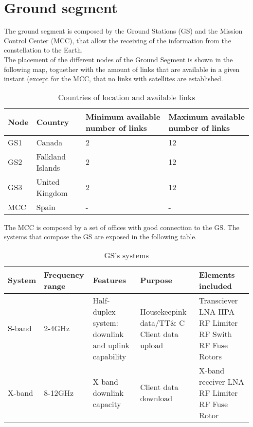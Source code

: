 \section{Ground segment}
The ground segment is composed by the Ground Stations (GS) and the Mission Control Center (MCC), that allow the receiving of the information from the constellation to the Earth.\\
The placement of the different nodes of the Ground Segment is shown in the following map, toguether with the amount of links that are available in a given instant (except for the MCC, that no links with satellites are established.  
\begin{table}[H]
\begin{center}
\begin{tabular}{|l|l|p{3.5cm}|p{3.5cm}|}
\hline
\rowcolor{blue} \textbf{Node}&\textbf{Country}&\textbf{Minimum available number of links}&\textbf{Maximum available number of links}\\
\hline
GS1&Canada&2&12\\
\hline
GS2&Falkland Islands&2&12\\
\hline
GS3&United Kingdom&2&12\\
\hline
MCC&Spain&-&-\\
\hline
\end{tabular}
\caption{Countries of location and available links}
\end{center}
\end{table}
The MCC is composed by a set of offices with good connection to the GS. The systems that compose the GS are exposed in the following table. 
\begin{table}[H]
\begin{center}
\begin{tabular}{|p{2cm}|p{2cm}|p{4cm}|p{4cm}|p{4cm}|}
\hline
\rowcolor{blue} \textbf{System}&\textbf{Frequency range}&\textbf{Features}&\textbf{Purpose}&\textbf{Elements included}\\
\hline
S-band&2-4GHz&Half-duplex system: downlink and uplink capability&Housekeepink data/TT\& C \newline
Client data upload&
Transciever 
\newline
LNA
\newline
HPA
\newline
RF Limiter
\newline
RF Swith
\newline
RF Fuse
\newline
Rotors\\
\hline
X-band&8-12GHz&X-band downlink capacity&Client data download&X-band receiver
\newline
LNA
\newline
RF Limiter
\newline
RF Fuse
\newline
Rotor\\
\hline
\end{tabular}
\caption{GS's systems}
\end{center}
\end{table}